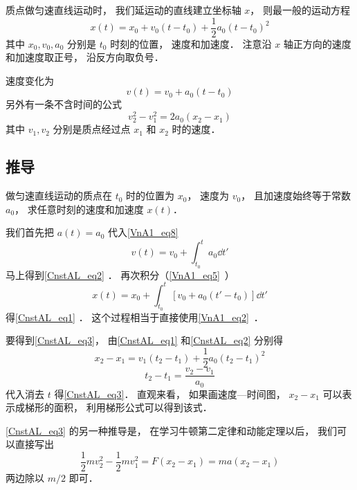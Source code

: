 
\begin{issues}
\issueTODO
\end{issues}


质点做匀速直线运动时， 我们延运动的直线建立坐标轴 $x$， 则最一般的运动方程
\begin{equation}\label{CnstAL_eq1}
x(t) = x_0 + v_0 (t - t_0) +  \frac12 a_0 (t - t_0)^2
\end{equation}
其中 $x_0, v_0, a_0$ 分别是 $t_0$ 时刻的位置， 速度和加速度． 注意沿 $x$ 轴正方向的速度和加速度取正号， 沿反方向取负号．

速度变化为
\begin{equation}\label{CnstAL_eq2}
v(t) = v_0 + a_0 (t - t_0)
\end{equation}
另外有一条不含时间的公式
\begin{equation}\label{CnstAL_eq3}
v_2^2 - v_1^2 = 2a_0 (x_2 - x_1)
\end{equation}
其中 $v_1, v_2$ 分别是质点经过点 $x_1$ 和 $x_2$ 时的速度．


\subsection{推导}
做匀速直线运动的质点在 $t_0$ 时的位置为 $x_0$， 速度为 $v_0$， 且加速度始终等于常数 $a_0$， 求任意时刻的速度和加速度 $x(t)$．

我们首先把 $a(t) = a_0$ 代入\autoref{VnA1_eq8}~
\begin{equation}
v(t) = v_0 + \int_{t_0}^t a_0 \dd{t'}
\end{equation}
马上得到\autoref{CnstAL_eq2} ． 再次积分（\autoref{VnA1_eq5}~）
\begin{equation}
x(t) = x_0 + \int_{t_0}^t [v_0 + a_0 (t' - t_0)] \dd{t'}
\end{equation}
得\autoref{CnstAL_eq1} ． 这个过程相当于直接使用\autoref{VnA1_eq2}~．

要得到\autoref{CnstAL_eq3}， 由\autoref{CnstAL_eq1} 和\autoref{CnstAL_eq2} 分别得
\begin{equation}
x_2 - x_1 = v_1 (t_2 - t_1) +  \frac12 a_0 (t_2 - t_1)^2
\end{equation}
\begin{equation}
t_2 - t_1 = \frac{v_2 - v_1}{a_0}
\end{equation}
代入消去 $t$ 得\autoref{CnstAL_eq3}． 直观来看， 如果画速度—时间图， $x_2 - x_1$ 可以表示成梯形的面积， 利用梯形公式可以得到该式．

\autoref{CnstAL_eq3} 的另一种推导是， 在学习牛顿第二定律和动能定理以后， 我们可以直接写出
\begin{equation}
\frac{1}{2}mv_2^2 - \frac{1}{2}mv_1^2 = F (x_2 - x_1) = ma (x_2 - x_1)
\end{equation}
两边除以 $m/2$ 即可．
